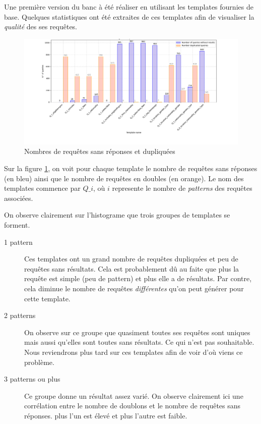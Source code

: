 \documentclass[12pt,titlepage]{article}
\begin{document}
Une première version du banc à été réaliser en utilisant les templates fournies de base. Quelques statistiques ont été extraites de ces templates afin de visualiser la \textit{qualité} des ses requêtes. 

\begin{figure}[!h]
  \centering
  \includegraphics[width=1.\textwidth]{img/zero_dup_per_template.png}
  \caption{Nombres de requêtes sans réponses et dupliquées}
  \label{zerodup}
\end{figure}

Sur la figure \ref{zerodup}, on voit pour chaque template le nombre de requêtes sans réponses (en bleu) ainsi que le nombre de requêtes en doubles (en orange). Le nom des templates commence par $Q\_i$, où $i$ represente le nombre de \textit{patterns} des requêtes associées.

On observe clairement sur l'histograme que trois groupes de templates se forment.

\begin{description}
  \item[1 pattern] Ces templates ont un grand nombre de requêtes dupliquées et peu de requêtes sans résultats. Cela est probablement dû au faite que plus la requête est simple (peu de pattern) et plus elle a de résultats. Par contre, cela diminue le nombre de requêtes \textit{différentes} qu'on peut générer pour cette template.
  \item[2 patterns] On observe sur ce groupe que quasiment toutes ses requêtes sont uniques mais aussi qu'elles sont toutes sans résultats. Ce qui n'est pas souhaitable. Nous reviendrons plus tard sur ces templates afin de voir d'où viens ce problème.
  \item[3 patterns ou plus] Ce groupe donne un résultat assez varié. On observe clairement ici une corrélation entre le nombre de doublons et le nombre de requêtes sans réponses. plus l'un est élevé et plus l'autre est faible.
\end{description}
\end{document}
